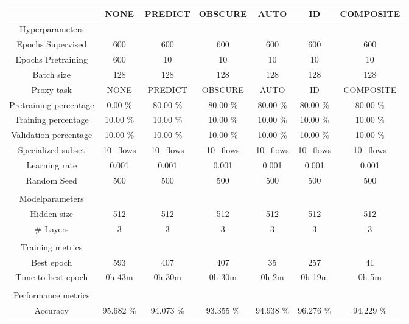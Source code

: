 \begin{table}[htb]
    \centering
    \begin{tabular}{@{}ccccccc@{}}
        \toprule
         &  NONE &  PREDICT &  OBSCURE &  AUTO &  ID &  COMPOSITE \\
        \midrule
        Hyperparameters &  &  &  &  &  &  \\
        Epochs Supervised &  600 &  600 &  600 &  600 &  600 &  600 \\
        Epochs Pretraining &  600 &  10 &  10 &  10 &  10 &  10 \\
        Batch size &  128 &  128 &  128 &  128 &  128 &  128 \\
        Proxy task &  NONE &  PREDICT &  OBSCURE &  AUTO &  ID &  COMPOSITE \\
        Pretraining percentage &  0.00 \% &  80.00 \% &  80.00 \% &  80.00 \% &  80.00 \% &  80.00 \% \\
        Training percentage &  10.00 \% &  10.00 \% &  10.00 \% &  10.00 \% &  10.00 \% &  10.00 \% \\
        Validation percentage &  10.00 \% &  10.00 \% &  10.00 \% &  10.00 \% &  10.00 \% &  10.00 \% \\
        Specialized subset &  10\_flows &  10\_flows &  10\_flows &  10\_flows &  10\_flows &  10\_flows \\
        Learning rate &  0.001 &  0.001 &  0.001 &  0.001 &  0.001 &  0.001 \\
        Random Seed &  500 &  500 &  500 &  500 &  500 &  500 \\
         \\
        Modelparameters &  &  &  &  &  &  \\
        Hidden size &  512 &  512 &  512 &  512 &  512 &  512 \\
        \# Layers &  3 &  3 &  3 &  3 &  3 &  3 \\
         \\
        Training metrics &  &  &  &  &  &  \\
        Best epoch &  593 &  407 &  407 &  35 &  257 &  41 \\
        Time to best epoch &  0h 43m &  0h 30m &  0h 30m &  0h 2m &  0h 19m &  0h 5m \\
         \\
        Performance metrics &  &  &  &  &  &  \\
        Accuracy &  95.682 \% &  94.073 \% &  93.355 \% &  94.938 \% &  96.276 \% &  94.229 \% \\

\end{tabular}
\end{table}

